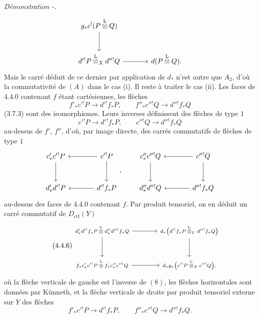\documentclass[11pt]{article}
\newenvironment{prooftext}[1][Proof]{\par\noindent\emph{#1.}\ }{\par\medskip}
\providecommand{\Dctf}{D_{\mathrm{ctf}}}
\providecommand{\Dctf}{D_{\mathrm{ctf}}}
\begin{document}
\begin{prooftext}[Démonstration -]
\[\begin{tikzcd}[column sep=large,row sep=large]
g_*c^!(P\overset{\mathrm{L}}{\otimes}Q)\arrow[d]\\
d'{}^!P\overset{\mathrm{L}}{\otimes}_Xd''{}^!Q \arrow[r] &
d(P\overset{\mathrm{L}}{\otimes}Q).
\end{tikzcd}
\]
Mais le carré déduit de ce dernier par application de $d_*$ n'est autre que $A_2$, d'où la commutativité de $(A)$ dans le cas (i). Il reste à traiter le cas (ii). Les faces de 4.4.0 contenant $f$ étant cartésiennes, les flèches
\[
f'_*c'{}^!P\longrightarrow d'{}^!f_*P,\qquad
f''_*c''{}^!Q\longrightarrow d''{}^!f_*Q
\]
(3.7.3) sont des isomorphismes. Leurs inverses définissent des flèches de type $1$
\[
c'{}^!P\longrightarrow d'{}^!f_*P,\qquad
c''{}^!Q\longrightarrow d''{}^!f_*Q
\]
au-dessus de $f'$, $f''$, d'où, par image directe, des carrés commutatifs de flèches de type $1$
\[
\begin{tikzcd}[column sep=large,row sep=large]
c'_*c'{}^!P \arrow[d] & c'{}^!P\arrow[l]\arrow[d]\\
d'_*d'{}^!P & d'{}^!f_*P\arrow[l]
\end{tikzcd}
,\qquad
\begin{tikzcd}[column sep=large,row sep=large]
c''_*c''{}^!Q \arrow[d] & c''{}^!Q\arrow[l]\arrow[d]\\
d''_*d''{}^!Q & d''{}^!f_*Q\arrow[l]
\end{tikzcd}
\]
au-dessus des faces de 4.4.0 contenant $f$. Par produit tensoriel, on en déduit un carré commutatif de $\Dctf(Y)$
\begin{equation}
\tag{4.4.6}
\begin{tikzcd}[column sep=large,row sep=large,cells={nodes={font=\scriptsize}},every label/.append style={font=\scriptsize}]
d'_*d'{}^!f_*P\overset{\mathrm{L}}{\otimes}d''_*d''{}^!f_*Q
 \arrow[r]\arrow[d] &
d_*\bigl(d'{}^!f_*P\overset{\mathrm{L}}{\otimes}_Yd''{}^!f_*Q\bigr)\arrow[d]\\
f_*c'_*c'{}^!P\overset{\mathrm{L}}{\otimes}f_*c''_*c''{}^!Q
 \arrow[r] &
d_*g_*\bigl(c'{}^!P\overset{\mathrm{L}}{\otimes}_Xc''{}^!Q\bigr),
\end{tikzcd}
\end{equation}
où la flèche verticale de gauche est l'inverse de $(8)$, les flèches horizontales sont données par Künneth, et la flèche verticale de droite par produit tensoriel externe sur $Y$ des flèches
\[
f'_*c'{}^!P\longrightarrow d'{}^!f_*P,\qquad
f''_*c''{}^!Q\longrightarrow d''{}^!f_*Q.
\]
\end{prooftext}
\end{document}
